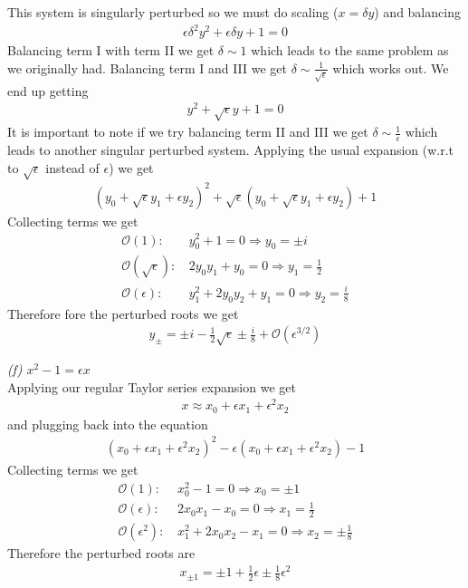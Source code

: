 \documentclass[12pt]{article}
\theoremstyle{remark}
\begin{document}
This system is singularly perturbed so we must do scaling ($x = \delta y$) and balancing
\begin{align*}
	\epsilon\delta^2y^2 + \epsilon\delta y + 1 = 0
\end{align*}
Balancing term I with term II we get $\delta \sim 1$ which leads to the same problem as we originally had. Balancing term I and III we get $\delta \sim \frac{1}{\sqrt{\epsilon}}$ which works out. We end up getting
\begin{align*}
	y^2 + \sqrt{\epsilon}y + 1 = 0
\end{align*}
It is important to note if we try balancing term II and III we get $\delta \sim \frac{1}{\epsilon}$ which leads to another singular perturbed system. Applying the usual expansion (w.r.t to $\sqrt{\epsilon}$ instead of $\epsilon$) we get
\begin{align*}
	(y_0 + \sqrt{\epsilon}y_1 + \epsilon y_2)^2 + \sqrt{\epsilon}(y_0 + \sqrt{\epsilon}y_1 + \epsilon y_2) + 1
\end{align*}
Collecting terms we get 
\begin{align*}
	\mathcal{O}(1): & \, y_0^2 + 1 = 0 \Rightarrow y_0 = \pm i \\ 
	\mathcal{O}(\sqrt{\epsilon}): & \, 2y_0y_1 + y_0 = 0 \Rightarrow y_1 = \frac{1}{2} \\
	\mathcal{O}(\epsilon): & \, y_1^2 + 2y_0y_2 + y_1 = 0 \Rightarrow y_2 = \frac{i}{8}
\end{align*}
Therefore fore the perturbed roots we get
\begin{align*}
	y_{\pm} = \pm i - \frac{1}{2}\sqrt{\epsilon} \pm \frac{i}{8} + \mathcal{O}(\epsilon^{3/2})
\end{align*}

\newpage

\textit{(f) $x^2 -1 = \epsilon x$} \\

Applying our regular Taylor series expansion we get 
\begin{align*}
	x \approx x_0 + \epsilon x_1 + \epsilon^2 x_2
\end{align*}
and plugging back into the equation
\begin{align*}
	(x_0 + \epsilon x_1 + \epsilon^2x_2)^2 - \epsilon(x_0 + \epsilon x_1 + \epsilon^2x_2) - 1
\end{align*}
Collecting terms we get
\begin{align*}
	\mathcal{O}(1): & \, x_0^2 - 1 = 0 \Rightarrow x_0 = \pm 1 \\
	\mathcal{O}(\epsilon): & \, 2x_0x_1 - x_0 = 0 \Rightarrow x_1 = \frac{1}{2} \\ 
	\mathcal{O}(\epsilon^2): & \, x_1^2 + 2x_0x_2 - x_1 = 0 \Rightarrow x_2 = \pm \frac{1}{8}
\end{align*}
Therefore the perturbed roots are 
\begin{align*}
	x_{\pm 1} = \pm 1 + 	\frac{1}{2}\epsilon \pm \frac{1}{8}\epsilon^2 
\end{align*}
\end{document}
